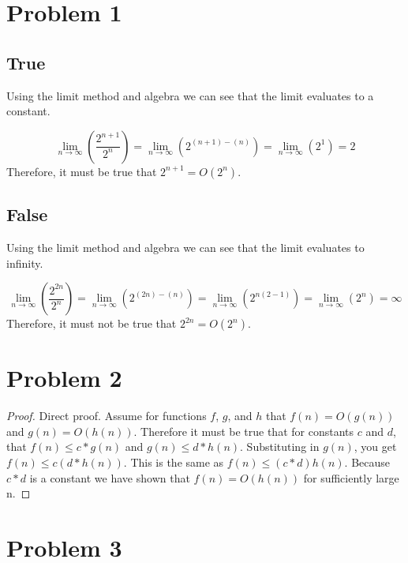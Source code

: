 \documentclass[11pt]{article}
\author{Josh Mayer}
\begin{document}
\section{Problem 1}

\subsection{True}

Using the limit method and algebra we
can see that the limit evaluates to a constant.

\begin{equation*}
    \lim _{n\to \infty }(\frac{2^{n+1}}{2^n})=
    \lim _{n\to \infty }(2^{(n+1)-(n)})=
    \lim _{n\to \infty }(2^{1})=
    2
\end{equation*}
Therefore, it must be true that $2^{n+1} = O(2^{n})$.

\subsection{False}

Using the limit method and algebra we
can see that the limit evaluates to infinity.

\begin{equation*}
    \lim _{n\to \infty }(\frac{2^{2n}}{2^n})=
    \lim _{n\to \infty }(2^{(2n)-(n)})=
    \lim _{n\to \infty }(2^{n(2-1)})=
    \lim _{n\to \infty }(2^{n})=
    \infty
\end{equation*}
Therefore, it must not be true that $2^{2n} = O(2^{n})$.

\section{Problem 2}
\begin{proof} Direct proof.
Assume for functions $f$, $g$, and $h$ that $f(n) = O(g(n))$ and $g(n) = O(h(n))$.
Therefore it must be true that for constants $c$ and $d$, that $f(n) \le c * g(n)$ and $g(n) \le d * h(n)$.
Substituting in $g(n)$, you get $f(n) \le c(d*h(n))$. This is the same as $f(n) \le (c*d) h(n)$.
Because $c*d$ is a constant we have shown that $f(n) = O(h(n))$ for sufficiently large n.
\end{proof}

\section{Problem 3}
\end{document}
